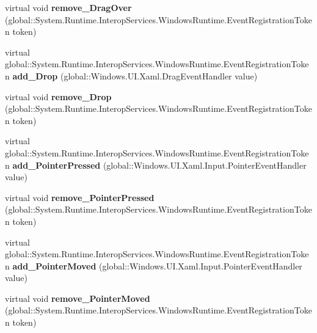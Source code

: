 \begin{DoxyCompactItemize}
virtual void {\bfseries remove\+\_\+\+Drag\+Over} (global\+::\+System.\+Runtime.\+Interop\+Services.\+Windows\+Runtime.\+Event\+Registration\+Token token)
\item 
\mbox{\label{class_windows_1_1_u_i_1_1_xaml_1_1_u_i_element_aaa06508f3ebb80d04bb09db0a46cd1bf}} 
virtual global\+::\+System.\+Runtime.\+Interop\+Services.\+Windows\+Runtime.\+Event\+Registration\+Token {\bfseries add\+\_\+\+Drop} (global\+::\+Windows.\+U\+I.\+Xaml.\+Drag\+Event\+Handler value)
\item 
\mbox{\label{class_windows_1_1_u_i_1_1_xaml_1_1_u_i_element_ac2b3602dc7f654559858450b171f9b01}} 
virtual void {\bfseries remove\+\_\+\+Drop} (global\+::\+System.\+Runtime.\+Interop\+Services.\+Windows\+Runtime.\+Event\+Registration\+Token token)
\item 
\mbox{\label{class_windows_1_1_u_i_1_1_xaml_1_1_u_i_element_a06d0eec496772934d5bfec139854c34c}} 
virtual global\+::\+System.\+Runtime.\+Interop\+Services.\+Windows\+Runtime.\+Event\+Registration\+Token {\bfseries add\+\_\+\+Pointer\+Pressed} (global\+::\+Windows.\+U\+I.\+Xaml.\+Input.\+Pointer\+Event\+Handler value)
\item 
\mbox{\label{class_windows_1_1_u_i_1_1_xaml_1_1_u_i_element_a4e21b0597f1640b1294e0dc5d330e6ca}} 
virtual void {\bfseries remove\+\_\+\+Pointer\+Pressed} (global\+::\+System.\+Runtime.\+Interop\+Services.\+Windows\+Runtime.\+Event\+Registration\+Token token)
\item 
\mbox{\label{class_windows_1_1_u_i_1_1_xaml_1_1_u_i_element_a35fdbc426595a77556b9e7587b4c8f8e}} 
virtual global\+::\+System.\+Runtime.\+Interop\+Services.\+Windows\+Runtime.\+Event\+Registration\+Token {\bfseries add\+\_\+\+Pointer\+Moved} (global\+::\+Windows.\+U\+I.\+Xaml.\+Input.\+Pointer\+Event\+Handler value)
\item 
\mbox{\label{class_windows_1_1_u_i_1_1_xaml_1_1_u_i_element_a63a39b75c65106c0b053b29fc0637f66}} 
virtual void {\bfseries remove\+\_\+\+Pointer\+Moved} (global\+::\+System.\+Runtime.\+Interop\+Services.\+Windows\+Runtime.\+Event\+Registration\+Token token)

\end{DoxyCompactItemize}
